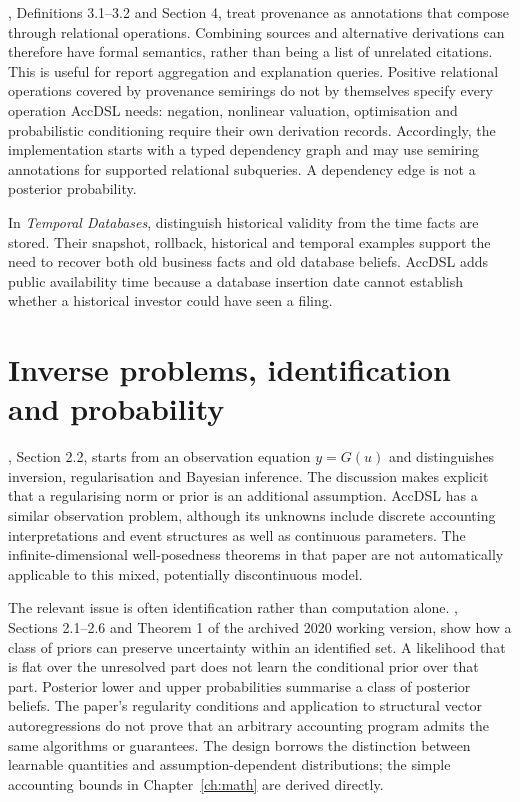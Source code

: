 \citet{green2007}, Definitions 3.1--3.2 and Section 4, treat provenance as
annotations that compose through relational operations. Combining sources
and alternative derivations can therefore have formal semantics, rather than
being a list of unrelated citations. This is useful for report aggregation and
explanation queries. Positive relational operations covered by provenance
semirings do not by themselves specify every operation AccDSL needs: negation,
nonlinear valuation, optimisation and probabilistic conditioning require their
own derivation records. Accordingly, the implementation starts with a typed
dependency graph and may use semiring annotations for supported relational
subqueries. A dependency edge is not a posterior probability.

In \emph{Temporal Databases}, \citet{snodgrass1986} distinguish historical
validity from the time facts are stored. Their snapshot, rollback, historical
and temporal examples support the need to
recover both old business facts and old database beliefs. AccDSL adds public
availability time because a database insertion date cannot establish whether
a historical investor could have seen a filing.

\section{Inverse problems, identification and probability}

\citet{stuart2010}, Section 2.2, starts from an observation equation
$y=G(u)$ and distinguishes inversion, regularisation and Bayesian inference.
The discussion makes explicit that a regularising norm or prior is an
additional assumption. AccDSL has a similar observation problem, although
its unknowns include discrete accounting interpretations and event structures
as well as continuous parameters. The infinite-dimensional well-posedness
theorems in that paper are not automatically applicable to this mixed,
potentially discontinuous model.

The relevant issue is often identification rather than computation alone.
\citet{giacomini2021}, Sections 2.1--2.6 and Theorem 1 of the archived 2020
working version, show how a class of priors can preserve uncertainty within
an identified set. A likelihood that is flat over the unresolved part does
not learn the conditional prior over that part. Posterior lower and upper
probabilities summarise a class of posterior beliefs. The paper's regularity
conditions and application to structural vector autoregressions do not prove
that an arbitrary accounting program admits the same algorithms or guarantees.
The design borrows the distinction between learnable quantities and
assumption-dependent distributions; the simple accounting bounds in
Chapter~\ref{ch:math} are derived directly.

